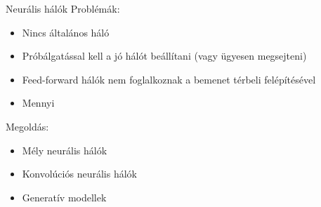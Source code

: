 \begin{frame}{Neurális hálók}
    Problémák:
    \begin{itemize}
        \item Nincs általános háló
        \item Próbálgatással kell a jó hálót beállítani (vagy ügyesen megsejteni)
        \item Feed-forward hálók nem foglalkoznak a bemenet térbeli felépítésével
        \item Mennyi 
    \end{itemize}
    
    Megoldás: 
    \begin{itemize}
        \item Mély neurális hálók
        \item Konvolúciós neurális hálók
        \item Generatív modellek
    \end{itemize}
\end{frame}

